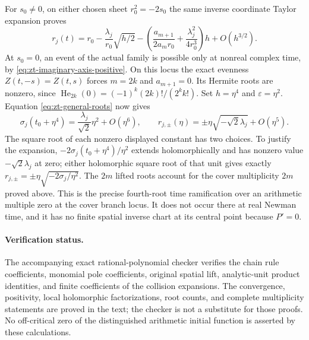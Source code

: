 For $s_0\ne0$, on either chosen sheet $r_0^2=-2s_0$ the same inverse
coordinate Taylor expansion proves
\[
 r_j(t)=r_0-\frac{\lambda_j}{r_0}\sqrt{h/2}
   -\left(\frac{a_{m+1}}{2a_mr_0}
                      +\frac{\lambda_j^2}{4r_0^3}\right)h
   +O(h^{3/2}).
\]
At $s_0=0$, an event of the actual family is possible only at
nonreal complex time, by \eqref{eq:zt-imaginary-axis-positive}.
On this locus the exact evenness $Z(t,-s)=Z(t,s)$ forces
$m=2k$ and $a_{m+1}=0$.  Its Hermite roots are nonzero, since
$\operatorname{He}_{2k}(0)=(-1)^k(2k)!/(2^kk!)$.
Set $h=\eta^4$ and $\varepsilon=\eta^2$.  Equation
\eqref{eq:zt-general-roots} now gives
\[
 \sigma_j(t_0+\eta^4)=\frac{\lambda_j}{\sqrt2}\eta^2+O(\eta^6),
 \qquad
 r_{j,\pm}(\eta)=\mathbin\pm\eta
                 \sqrt{-\sqrt2\lambda_j}+O(\eta^5).
\]
The square root of each nonzero displayed constant has two choices.
To justify the expansion, $-2\sigma_j(t_0+\eta^4)/\eta^2$
extends holomorphically and has nonzero value
$-\sqrt2\lambda_j$ at zero; either holomorphic square root of that
unit gives exactly $r_{j,\pm}=\pm\eta\sqrt{-2\sigma_j/\eta^2}$.
The $2m$ lifted roots account for the cover multiplicity $2m$ proved
above.  This is the precise fourth-root time ramification over an
arithmetic multiple zero at the cover branch locus.  It does not
occur there at real Newman time, and it has no finite spatial inverse
chart at its central point because $P'=0$.

\paragraph{Verification status.}
The accompanying exact rational-polynomial checker verifies the chain
rule coefficients, monomial pole coefficients, original spatial lift,
analytic-unit product identities, and finite coefficients of the
collision expansions.  The convergence, positivity, local holomorphic
factorizations, root counts, and complete multiplicity statements are
proved in the text; the checker is not a substitute for those proofs.
No off-critical zero of the distinguished arithmetic initial function
is asserted by these calculations.
